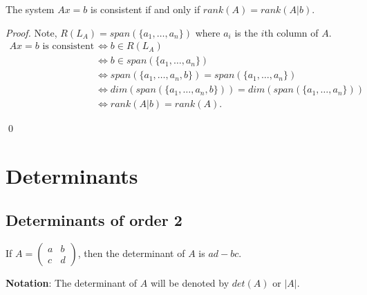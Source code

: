 \documentclass[12pt]{article}
\newenvironment{theorem}[2][Theorem]{\begin{trivlist}
\item[\hskip \labelsep {\bfseries #1}\hskip \labelsep {\bfseries #2.}]}{\end{trivlist}}
\newenvironment{definition}[2][Definition]{\begin{trivlist}
\item[\hskip \labelsep {\bfseries #1}\hskip \labelsep {\bfseries #2}]}{\end{trivlist}}
\newenvironment{sol}
    {\emph{Proof.}
    }
    {
    \qed
    }
\begin{document}
\begin{theorem}{3.11}
The system $Ax = b$ is consistent if and only if $rank(A) = rank(A | b)$.
\end{theorem}

\begin{sol} Note, $R(L_A) = span(\{ a_1, \dots, a_n \})$ where $a_i$ is the $i$th column of $A$.
\begin{align*}
    Ax = b\text{ is consistent } &\Longleftrightarrow b \in R(L_A) \\
    &\Longleftrightarrow b \in span(\{ a_1, \dots, a_n \}) \\
    &\Longleftrightarrow span(\{ a_1, \dots, a_n, b \}) = span(\{ a_1, \dots, a_n \}) \\
    &\Longleftrightarrow dim(span(\{ a_1, \dots, a_n, b \})) = dim(span(\{ a_1, \dots, a_n \})) \\
    &\Longleftrightarrow rank(A | b) = rank(A).
\end{align*}
\end{sol}

\section{Determinants}
\subsection{Determinants of order 2}

\begin{definition}{1}
If $A = \begin{pmatrix}
a & b \\
c & d
\end{pmatrix}$, then the determinant of $A$ is $ad-bc$.
\end{definition}

\textbf{Notation}: The determinant of $A$ will be denoted by $det(A)$ or $\lvert A \rvert$.
\end{document}

